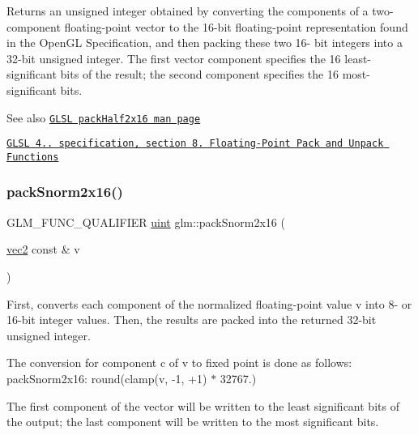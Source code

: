 Returns an unsigned integer obtained by converting the components of a two-\/component floating-\/point vector to the 16-\/bit floating-\/point representation found in the Open\+GL Specification, and then packing these two 16-\/ bit integers into a 32-\/bit unsigned integer. The first vector component specifies the 16 least-\/significant bits of the result; the second component specifies the 16 most-\/significant bits.

\begin{DoxySeeAlso}{See also}
\href{http://www.opengl.org/sdk/docs/manglsl/xhtml/packHalf2x16.xml}{\tt G\+L\+SL pack\+Half2x16 man page} 

\href{http://www.opengl.org/registry/doc/GLSLangSpec.4.20.8.pdf}{\tt G\+L\+SL 4.. specification, section 8. Floating-\/\+Point Pack and Unpack Functions} 
\end{DoxySeeAlso}
\mbox{\label{group__core__func__packing_ga0c8005de240d6c4ca3d16c7bee25c622}} 
\subsubsection{\texorpdfstring{pack\+Snorm2x16()}{packSnorm2x16()}}
{\footnotesize\ttfamily G\+L\+M\+\_\+\+F\+U\+N\+C\+\_\+\+Q\+U\+A\+L\+I\+F\+I\+ER \hyperlink{group__core__precision_ga4fd29415871152bfb5abd588334147c8}{uint} glm\+::pack\+Snorm2x16 (\begin{DoxyParamCaption}\item[{\hyperlink{group__core__types_gaa1618f51db67eaa145db101d8c8431d8}{vec2} const \&}]{v }\end{DoxyParamCaption})}

First, converts each component of the normalized floating-\/point value v into 8-\/ or 16-\/bit integer values. Then, the results are packed into the returned 32-\/bit unsigned integer.

The conversion for component c of v to fixed point is done as follows\+: pack\+Snorm2x16\+: round(clamp(v, -\/1, +1) $\ast$ 32767.)

The first component of the vector will be written to the least significant bits of the output; the last component will be written to the most significant bits.

